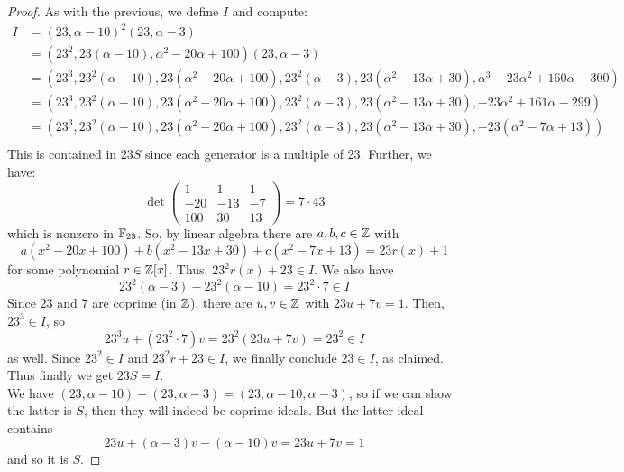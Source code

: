 \begin{proof}
	As with the previous, we define $I$ and compute:
	\begin{align*}
	I
		&= (23,\alpha-10)^2(23,\alpha-3) \\
		&= (23^2,23(\alpha-10),\alpha^2-20\alpha+100)(23,\alpha-3) \\
		&= (23^3, 23^2(\alpha-10), 23(\alpha^2-20\alpha+100), 23^2(\alpha-3), 23(\alpha^2-13\alpha+30), \alpha^3-23\alpha^2+160\alpha-300) \\
		&= (23^3, 23^2(\alpha-10), 23(\alpha^2-20\alpha+100), 23^2(\alpha-3), 23(\alpha^2-13\alpha+30), -23\alpha^2+161\alpha-299) \\
		&= (23^3, 23^2(\alpha-10), 23(\alpha^2-20\alpha+100), 23^2(\alpha-3), 23(\alpha^2-13\alpha+30), -23(\alpha^2-7\alpha+13)) \\
	\end{align*}
	This is contained in $23S$ since each generator is a multiple of 23. Further, we have:
	\[ \det\left(\begin{array}{ccc} 1 & 1 & 1 \\ -20 & -13 & -7 \\ 100 & 30 & 13 \end{array}\right) = 7 \cdot 43 \]
	which is nonzero in $\mathbb{F}_{23}$. So, by linear algebra there are $a,b,c \in \mathbb{Z}$ with
	\[ a(x^2-20x+100) + b(x^2-13x+30) + c(x^2-7x+13) = 23r(x)+1 \]
	for some polynomial $r \in \mathbb{Z}[x]$. Thus, $23^2r(x)+23 \in I$. We also have
	\[ 23^2(\alpha-3) - 23^2(\alpha-10) = 23^2 \cdot 7 \in I \]
	Since $23$ and $7$ are coprime (in $\mathbb{Z}$), there are $u,v \in \mathbb{Z}$ with $23u+7v=1$. Then, $23^3 \in I$, so
	\[ 23^3u+(23^2 \cdot 7)v = 23^2(23u+7v) = 23^2 \in I \]
	as well. Since $23^2 \in I$ and $23^2r + 23 \in I$, we finally conclude $23 \in I$, as claimed. Thus finally we get $23S = I$. \\
	
	We have $(23,\alpha-10) + (23,\alpha-3) = (23,\alpha-10,\alpha-3)$, so if we can show the latter is $S$, then they will indeed be coprime ideals. But the latter ideal contains
	\[ 23u + (\alpha-3)v - (\alpha-10)v = 23u + 7v = 1 \]
	and so it is $S$.
\end{proof}
